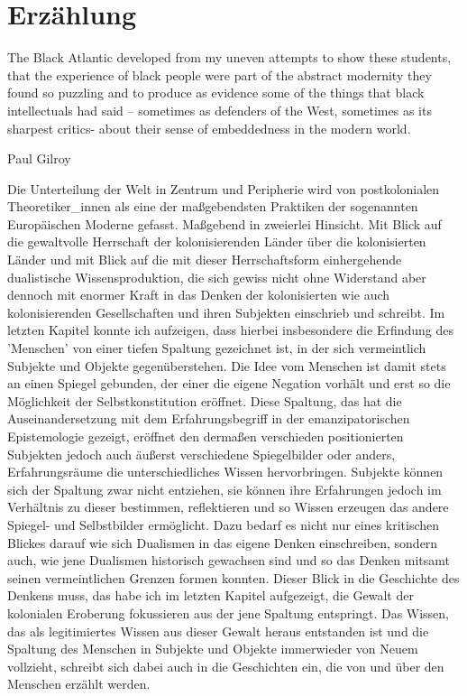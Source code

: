 \section{Erzählung}
\epigraph{
The Black Atlantic developed from my uneven attempts to show these students, that the experience of black people were part of the abstract modernity they found so puzzling and to produce as evidence some of the things that black intellectuals had said – sometimes as defenders of the West, sometimes as its sharpest critics- about their sense of embeddedness in the modern world.
}{Paul Gilroy\footnotemark} 

Die Unterteilung der Welt in Zentrum und Peripherie wird von postkolonialen
Theoretiker\_innen als eine der maßgebendsten Praktiken der sogenannten
Europäischen Moderne gefasst. Maßgebend in zweierlei Hinsicht. Mit Blick auf
die gewaltvolle Herrschaft der kolonisierenden Länder über die kolonisierten
Länder und mit Blick auf die mit dieser Herrschaftsform einhergehende
dualistische Wissensproduktion, die sich gewiss nicht ohne
Widerstand\footnotemark {} aber
dennoch mit enormer Kraft in das Denken der kolonisierten wie auch
kolonisierenden Gesellschaften und ihren Subjekten einschrieb und
schreibt.\footnotemark {} Im letzten Kapitel konnte ich aufzeigen, dass hierbei
insbesondere die Erfindung des 'Menschen' von einer tiefen Spaltung gezeichnet
ist, in der sich vermeintlich Subjekte und Objekte gegenüberstehen. Die Idee
vom Menschen ist damit stets an einen Spiegel gebunden, der einer die eigene
Negation vorhält und erst so die Möglichkeit der Selbstkonstitution eröffnet.
Diese Spaltung, das hat die Auseinandersetzung mit dem Erfahrungsbegriff in der
emanzipatorischen Epistemologie gezeigt, eröffnet den dermaßen verschieden
positionierten Subjekten jedoch auch äußerst verschiedene Spiegelbilder oder
anders, Erfahrungsräume die unterschiedliches Wissen hervorbringen. Subjekte
können sich der Spaltung zwar nicht entziehen, sie können ihre Erfahrungen
jedoch im Verhältnis zu dieser bestimmen, reflektieren und so Wissen erzeugen
das andere Spiegel- und Selbstbilder ermöglicht. Dazu bedarf es nicht nur eines
kritischen Blickes darauf wie sich Dualismen in das eigene Denken einschreiben,
sondern auch, wie jene Dualismen historisch gewachsen sind und so das Denken
mitsamt seinen vermeintlichen Grenzen formen konnten. Dieser Blick in die
Geschichte des Denkens muss, das habe ich im letzten Kapitel aufgezeigt, die
Gewalt der kolonialen Eroberung fokussieren aus der jene Spaltung entspringt.
Das Wissen, das als legitimiertes Wissen aus dieser Gewalt heraus entstanden
ist und die Spaltung des Menschen in Subjekte und Objekte immerwieder von Neuem
vollzieht, schreibt sich dabei auch in die Geschichten ein, die von und über den Menschen erzählt werden.

